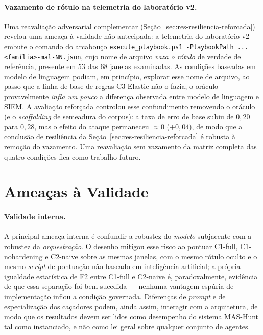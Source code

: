 \paragraph{Vazamento de rótulo na telemetria do laboratório v2.} Uma reavaliação
adversarial complementar (Seção~\ref{sec:res-resiliencia-reforcada}) revelou uma
ameaça à validade não antecipada: a telemetria do laboratório v2 embute o comando
do arcabouço \texttt{execute\_playbook.ps1 -PlaybookPath ...<família>-mal-NN.json},
cujo nome de arquivo \emph{vaza o rótulo} de verdade de referência, presente em
$53$ das $68$ janelas examinadas. As condições baseadas em modelo de linguagem
podiam, em princípio, explorar esse nome de arquivo, ao passo que a linha de base
de regras C3-Elastic não o fazia; o oráculo provavelmente \emph{infla um pouco} a
diferença observada entre modelo de linguagem e SIEM. A avaliação reforçada
controlou esse confundimento removendo o oráculo (e o \textit{scaffolding} de
semeadura do corpus): a taxa de erro de base subiu de $0{,}20$ para $0{,}28$, mas
o efeito do ataque permaneceu $\approx 0$ ($+0{,}04$), de modo que a conclusão de
resiliência da Seção~\ref{sec:res-resiliencia-reforcada} é robusta à remoção do
vazamento. Uma reavaliação sem vazamento da matriz completa das quatro condições
fica como trabalho futuro.

\section{Ameaças à Validade}
\label{sec:disc-validade}

\paragraph{Validade interna.} A principal ameaça interna é confundir a robustez do
\emph{modelo} subjacente com a robustez da \emph{orquestração}. O desenho mitigou
esse risco ao pontuar C1-full, C1-nohardening e C2-naive sobre as mesmas janelas,
com o mesmo rótulo oculto e o mesmo \textit{script} de pontuação não baseado em
inteligência artificial; a própria igualdade estatística de F2 entre C1-full e
C2-naive é, paradoxalmente, evidência de que essa separação foi bem-sucedida ---
nenhuma vantagem espúria de implementação inflou a condição governada.
Diferenças de \textit{prompt} e de especialização dos caçadores podem, ainda
assim, interagir com a arquitetura, de modo que os resultados devem ser lidos como
desempenho do sistema MAS-Hunt tal como instanciado, e não como lei geral sobre
qualquer conjunto de agentes.

